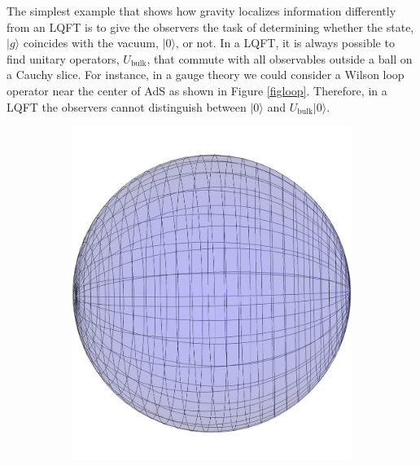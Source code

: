 \documentclass[12pt]{article}
\newcommand{\ubulk}{U_{\text{bulk}}}
\begin{document}
The simplest example that shows how gravity localizes information differently from an LQFT is to give the observers the task of determining whether the state, $|g \rangle$ coincides with the vacuum, $|0 \rangle$, or not. In a LQFT, it is always possible to find unitary operators, $\ubulk$, that  commute with all observables outside a ball on a Cauchy slice.  For instance, in a gauge theory we could consider a Wilson loop operator near the center of AdS as shown in Figure \ref{figloop}.  Therefore, in a LQFT the observers cannot distinguish between $| 0 \rangle$ and $\ubulk | 0 \rangle$. 
\begin{figure}[!ht]
\centering
\begin{subfigure}{0.4\textwidth}
\centering
\includegraphics[height=0.3\textheight]{nothinginside.pdf}
\caption{\label{leftfig}}
\end{subfigure}
\hspace{0.15\textwidth}
\begin{subfigure}{0.4\textwidth}
\centering

\end{subfigure}
\end{figure}
\end{document}
